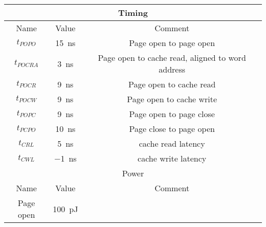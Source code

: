 \begin{table}[h]
{\begin{tabular}{|c|c|c|}
      \multicolumn{3}{|c|}{{\cellcolor{gray!25}}Timing}                                                                                               \\\hline
      {\cellcolor{gray!25}}Name       &   {\cellcolor{gray!25}}Value                  & {\cellcolor{gray!25}}Comment                                  \\\hline
      $t_{POPO}$                      &   \SI[per-mode=symbol]{15}{\nano\second}      & Page open to page open                                        \\\hline
      $t_{POCRA}$                     &   \SI[per-mode=symbol]{ 3}{\nano\second}      & Page open to cache read, aligned to word address              \\\cline{1-3}
      $t_{POCR}$                      &   \SI[per-mode=symbol]{ 9}{\nano\second}      & Page open to cache read                                       \\\cline{1-3}
      $t_{POCW}$                      &   \SI[per-mode=symbol]{ 9}{\nano\second}      & Page open to cache write                                      \\\cline{1-3}
      $t_{POPC}$                      &   \SI[per-mode=symbol]{ 9}{\nano\second}      & Page open to page close                                       \\\cline{1-3}
      $t_{PCPO}$                      &   \SI[per-mode=symbol]{10}{\nano\second}      & Page close to page open                                       \\\cline{1-3}
      $t_{CRL} $                      &   \SI[per-mode=symbol]{ 5}{\nano\second}      & cache read latency                                            \\\cline{1-3}
      $t_{CWL} $                      &   \SI[per-mode=symbol]{-1}{\nano\second}      & cache write latency                                           \\\hline
      \multicolumn{3}{|c|}{{\cellcolor{gray!25}}Power}                                                                                                \\\hline
      {\cellcolor{gray!25}}Name       &   {\cellcolor{gray!25}}Value                  & {\cellcolor{gray!25}}Comment                                  \\\hline
      Page open                       &   \SI[per-mode=symbol]{100}{\pico\joule }     &                                                               \\\hline

\end{tabular}}
\end{table}
